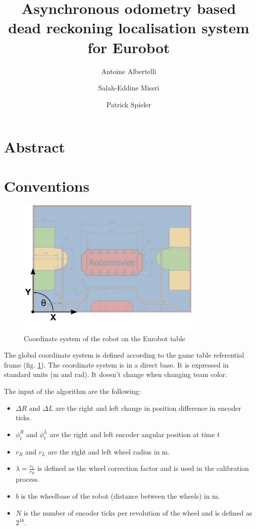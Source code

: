 \documentclass[a4paper, 10pt]{article}
\author{Antoine Albertelli \texttt{} \and
        Salah-Eddine Missri \texttt{} \and
        Patrick Spieler \texttt{}}
\title{Asynchronous odometry based dead reckoning localisation system for Eurobot}
\begin{document}
\maketitle
\hrulefill
\tableofcontents
\hrulefill

\section*{Abstract}
\lipsum[1]

\section{Conventions}
\begin{figure}[h]
    \begin{center}
        \includegraphics[width=0.8\textwidth]{table}
        \caption{Coordinate system of the robot on the Eurobot table}
        \label{fig:coordinates}
    \end{center}
\end{figure}

The global coordinate system is defined according to the game table referential frame (fig. \ref{fig:coordinates}).
The coordinate system is in a direct base.
It is expressed in standard units (\si{\meter} and \si{\radian}).
It doesn't change when changing team color.

The input of the algorithm are the following:
\begin{itemize}
    \item $\Delta R$ and $\Delta L$ are the right and left change in position difference in encoder ticks.
    \item $\phi_t^R$ and $\phi_t^L$ are the right and left encoder angular position at time $t$
    \item $r_R$ and $r_L$ are the right and left wheel radius in \si{\meter}.
    \item $\lambda = \frac{r_L}{r_R}$ is defined as the wheel correction factor and is used in the calibration process.
    \item $b$ is the wheelbase of the robot (distance between the wheels) in \si{\meter}.
    \item $N$ is the number of encoder ticks per revolution of the wheel and is defined as $2^{16}$.
\end{itemize}
\end{document}
